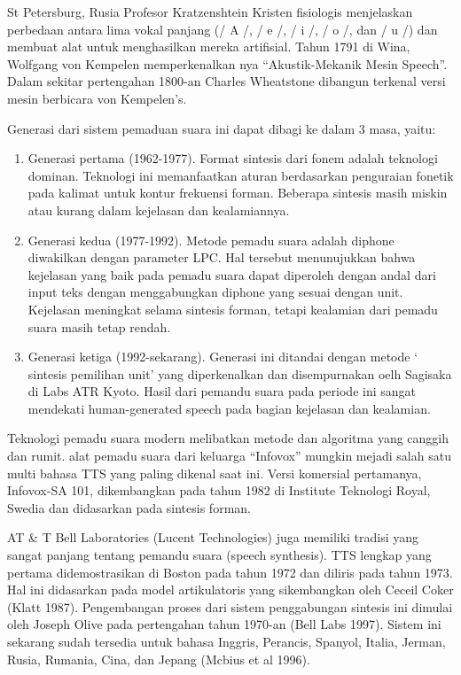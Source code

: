 St Petersburg, Rusia Profesor Kratzenshtein Kristen  fisiologis menjelaskan perbedaan antara lima vokal panjang  (/ A /, / e /, / i /, / o /, dan / u /) dan membuat alat untuk menghasilkan  mereka artifisial. Tahun 1791 di Wina, Wolfgang von Kempelen memperkenalkan nya “Akustik-Mekanik Mesin Speech”. Dalam  sekitar pertengahan 1800-an Charles Wheatstone dibangun terkenal  versi mesin berbicara von Kempelen’s.

Generasi dari sistem pemaduan suara ini dapat dibagi ke dalam 3 masa, yaitu:

\begin{enumerate}
\item Generasi pertama (1962-1977). Format sintesis dari fonem adalah teknologi dominan. Teknologi ini memanfaatkan aturan berdasarkan penguraian fonetik pada kalimat untuk kontur frekuensi forman. Beberapa sintesis masih miskin atau kurang dalam kejelasan dan kealamiannya.
\item Generasi kedua (1977-1992). Metode pemadu suara adalah diphone diwakilkan  dengan parameter LPC. Hal tersebut menunujukkan bahwa kejelasan yang baik pada pemadu suara dapat diperoleh dengan andal dari input teks dengan menggabungkan diphone yang sesuai dengan unit. Kejelasan meningkat selama sintesis forman, tetapi kealamian dari pemadu suara masih tetap rendah.
\item Generasi ketiga (1992-sekarang). Generasi ini ditandai dengan metode ‘ sintesis pemilihan unit’ yang diperkenalkan dan disempurnakan oelh Sagisaka di Labs ATR Kyoto. Hasil dari pemandu suara pada periode ini sangat mendekati human-generated speech pada bagian kejelasan dan kealamian.
\end{enumerate}

Teknologi pemadu suara modern melibatkan metode dan algoritma yang canggih dan rumit. alat pemadu suara  dari keluarga “Infovox” mungkin mejadi salah satu multi bahasa TTS yang paling dikenal saat ini. Versi komersial pertamanya, Infovox-SA 101, dikembangkan pada tahun 1982 di Institute Teknologi Royal, Swedia dan didasarkan pada sintesis forman.

AT \& T Bell Laboratories (Lucent Technologies) juga memiliki tradisi yang sangat panjang tentang pemandu suara (speech synthesis). TTS lengkap yang pertama didemostrasikan di Boston pada tahun 1972 dan diliris pada tahun 1973. Hal ini didasarkan pada model artikulatoris yang sikembangkan oleh Ceceil Coker (Klatt 1987). Pengembangan proses dari sistem penggabungan sintesis ini dimulai oleh Joseph Olive pada pertengahan tahun 1970-an (Bell Labs 1997). Sistem ini sekarang sudah tersedia untuk bahasa Inggris, Perancis, Spanyol, Italia, Jerman, Rusia, Rumania, Cina, dan Jepang (Mcbius et al 1996).

